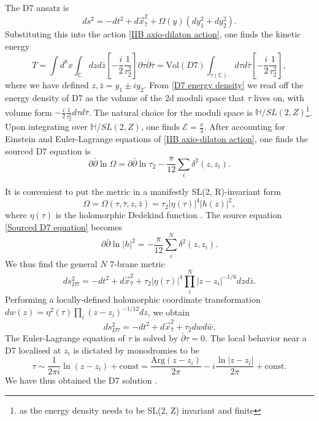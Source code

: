 The D7 ansatz is
\begin{equation}
ds^2 = -dt^2+d\vec{x}_7^2 + \Omega(y)(dy_1^2 +dy_2^2).
\label{D7 ansatz}
\end{equation}
Substituting this into the action \eqref{IIB axio-dilaton action}, one finds the kinetic energy
\begin{equation}
T = 
\int d^8x\int_{\mathbb{C}}dzd\bar{z}\left[-\frac{i}{2}\frac{1}{\tau_2^2}\right]\partial \tau \bar\partial \bar\tau
=\text{Vol}(D7) \int_{\tau(\mathbb{C})}d\tau d\bar\tau\left[-\frac{i}{2}\frac{1}{\tau_2^2}\right],
\label{D7 energy density}
\end{equation}
where we have defined $z,\bar z = y_1\pm iy_2$. 
From \eqref{D7 energy density} we read off the energy density of D7 as the volume of the 2d moduli space that $\tau$ lives on, with volume form $-\tfrac{i}{2}\tfrac{1}{\tau_2^2}d\tau d\bar\tau$. 
The natural choice for the moduli space is $\mathbb{H}/SL(2, Z)$\footnote{
as the energy density needs to be SL(2, Z) invariant and finite}. 
Upon integrating over $\mathbb{H}/SL(2, Z)$, one finds \cite{Greene:1989ya} $\mathcal E = \frac{\pi}{3}$.
After accounting for Einstein and Euler-Lagrange equations of \eqref{IIB axio-dilaton action}, one finds the sourced D7 equation is \cite{Bergshoeff:2006jj,Greene:1989ya}
\begin{equation}
\partial\bar\partial \ln \Omega = \partial\bar\partial \ln\tau_2-\frac{\pi}{12}\sum_i\delta^2(z,z_i).
\label{Sourced D7 equation}
\end{equation}

It is convenient to put the metric in a manifestly SL(2, R)-invariant form
\begin{equation}
\Omega = \Omega(\tau,\bar\tau,z,\bar z)=\tau_2 |\eta(\tau)|^4 |h(z)|^2,
\end{equation}
where $\eta(\tau)$ is the holomorphic Dedekind function \cite{Greene:1989ya}. The source equation \eqref{Sourced D7 equation} becomes
\begin{equation}
\partial\bar\partial \ln|h|^2 =-\frac{\pi}{12}\sum_i^N\delta^2(z,z_i).
\end{equation}
We thus find the general $N$ 7-brane metric
\begin{equation}
ds^2_{D7} = -dt^2+d\vec{x}_7^2+\tau_2|\eta(\tau)|^4\prod_i^N|z-z_i|^{-1/6} dzd\bar z.
\end{equation}
Performing a locally-defined holomorphic coordinate transformation $dw(z) = \eta^2(\tau)\prod_i (z-z_i)^{-1/12} dz$, we obtain
\begin{equation}
ds^2_{D7} = -dt^2 + d\vec{x}_7^2 + \tau_2 dwd\bar w.
\label{D7 solution}
\end{equation}
The Euler-Lagrange equation of $\tau$ is solved by $\bar\partial\tau=0$. 
The local behavior near a D7 localised at $z_i$ is dictated by monodromies to be
\begin{equation}
\tau \sim \frac{1}{2\pi i}\ln (z-z_i)+\text{const}
 = \frac{\text{Arg}(z-z_i)}{2\pi} -i\frac{\ln |z-z_i|}{2\pi}+\text{const}.
 \label{D7 axio-dilaton profile}
\end{equation}
We have thus obtained the D7 solution \cite{Gibbons:1995vg,Bergshoeff:2006jj,Greene:1989ya}.

